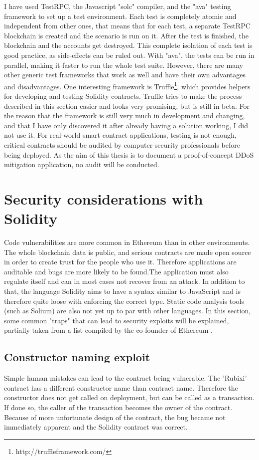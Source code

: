 I have used TestRPC, the Javascript "solc" compiler, and the "ava" testing framework to set up a test environment. Each test is completely atomic and independent from other ones, that means that for each test, a separate TestRPC blockchain is created and the scenario is run on it. After the test is finished, the blockchain and the accounts get destroyed. This complete isolation of each test is good practice, as side-effects can be ruled out. With "ava", the tests can be run in parallel, making it faster to run the whole test suite. However, there are many other generic test frameworks that work as well and have their own advantages and disadvantages. One interesting framework is Truffle\footnote{http://truffleframework.com/}, which provides helpers for developing and testing Solidity contracts. Truffle tries to make the process described in this section easier and looks very promising, but is still in beta. For the reason that the framework is still very much in development and changing, and that I have only discovered it after already having a solution working, I did not use it.
For real-world smart contract applications, testing is not enough, critical contracts should be audited by computer security professionals before being deployed. As the aim of this thesis is to document a proof-of-concept DDoS mitigation application, no audit will be conducted.

\section{Security considerations with Solidity}
Code vulnerabilities are more common in Ethereum than in other environments. The whole blockchain data is public, and serious contracts are made open source in order to create trust for the people who use it. Therefore applications are auditable and bugs are more likely to be found.The application must also regulate itself and can in most cases not recover from an attack.
In addition to that, the language Solidity aims to have a syntax similar to JavaScript and is therefore quite loose with enforcing the correct type. Static code analysis tools (such as Solium) are also not yet up to par with other languages.
In this section, some common "traps" that can lead to security exploits will be explained, partially taken from a list compiled by the co-founder of Ethereum \cite{ThinkingAboutSmartContractSecurity}.

\subsection{Constructor naming exploit}
Simple human mistakes can lead to the contract being vulnerable. The 'Rubixi' contract has a different constructor name than contract name. Therefore the constructor does not get called on deployment, but can be called as a transaction. If done so, the caller of the transaction becomes the owner of the contract. Because of more unfortunate design of the contract, the bug became not immediately apparent and the Solidity contract was correct.

